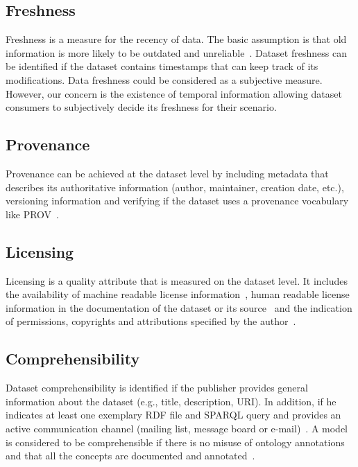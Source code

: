 \documentclass[onecolumn, crcready]{../../Util/LaTEX/iosart2c}
\begin{document}
\subsection{Freshness}
Freshness is a measure for the recency of data. The basic assumption is that old information is more likely to be outdated and unreliable~\cite{Flouris:EvoDyn:12}. Dataset freshness can be identified if the dataset contains timestamps that can keep track of its modifications. Data freshness could be considered as a subjective measure. However, our concern is the existence of temporal information allowing dataset consumers to subjectively decide its freshness for their scenario.

\subsection{Provenance}
Provenance can be achieved at the dataset level by including metadata that describes its authoritative information (author, maintainer, creation date, etc.), versioning information and verifying if the dataset uses a provenance vocabulary like PROV~\cite{Lebo:W3C:13}.

\subsection{Licensing}
Licensing is a quality attribute that is measured on the dataset level. It includes the availability of machine readable license information~\cite{Hogan:WebSemJorunal:12}, human readable license information in the documentation of the dataset or its source~\cite{Hogan:WebSemJorunal:12} and the indication of permissions, copyrights and attributions specified by the author~\cite{Zaveri:SemWebJorunal:12}.

\subsection{Comprehensibility}
Dataset comprehensibility is identified if the publisher provides general information about the dataset (e.g., title, description, URI). In addition, if he indicates at least one exemplary RDF file and SPARQL query and provides an active communication channel (mailing list, message board or e-mail)~\cite{Flemming:Thesis:10}. A model is considered to be comprehensible if there is no misuse of ontology annotations and that all the concepts are documented and annotated~\cite{Mader:TBDL:12,Maria:KEOD:13}.
\end{document}
